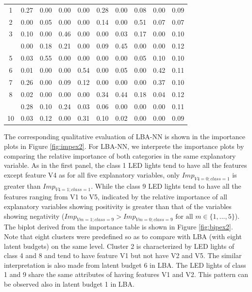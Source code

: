 \documentclass[]{interact}
\theoremstyle{plain}%
\theoremstyle{definition}
\theoremstyle{remark}
\begin{document}
\begin{table}[H]
{\begin{tabular}[t]{cccccccccc}
1 & 0.27 & 0.00 & 0.00 & 0.00 & 0.28 & 0.00 & 0.08 & 0.00 & 0.09\\
2 & 0.00 & 0.05 & 0.00 & 0.00 & 0.14 & 0.00 & 0.51 & 0.07 & 0.07\\
3 & 0.10 & 0.00 & 0.46 & 0.00 & 0.00 & 0.03 & 0.17 & 0.00 & 0.10\\
\addlinespace
4 & 0.00 & 0.18 & 0.21 & 0.00 & 0.09 & 0.45 & 0.00 & 0.00 & 0.12\\
5 & 0.03 & 0.55 & 0.00 & 0.00 & 0.00 & 0.00 & 0.05 & 0.10 & 0.10\\
6 & 0.01 & 0.00 & 0.00 & 0.54 & 0.00 & 0.05 & 0.00 & 0.42 & 0.11\\
7 & 0.26 & 0.00 & 0.09 & 0.12 & 0.00 & 0.00 & 0.00 & 0.37 & 0.10\\
8 & 0.02 & 0.00 & 0.00 & 0.00 & 0.34 & 0.44 & 0.18 & 0.04 & 0.12\\
\addlinespace
9 & 0.28 & 0.10 & 0.24 & 0.03 & 0.06 & 0.00 & 0.00 & 0.00 & 0.11\\
10 & 0.03 & 0.12 & 0.00 & 0.31 & 0.10 & 0.02 & 0.00 & 0.00 & 0.09\\
\bottomrule
\end{tabular}}
\end{table}

The corresponding qualitative evaluation of LBA-NN is shown in the
importance plots in Figure \ref{fig:impex2}. For LBA-NN, we interprete
the importance plots by comparing the relative importance of both
categories in the same explanatory variable. As in the first panel, the
class 1 LED lights tend to have all the features except feature V4 as
for all five explanatory variables, only \(Imp_{V4=0;class=1}\) is
greater than \(Imp_{V4=1;class=1}\). While the class 9 LED lights tend
to have all the features ranging from V1 to V5, indicated by the
relative importance of all explanatory variables showing positivity is
greater than that of the variables showing negativity
(\(Imp_{Vm=1;class=9} > Imp_{Vm=0;class=9} \text{ for all } m \in \{1, ...,5\}\)).
The biplot derived from the importance table is shown in Figure
\ref{fig:bipex2}. Note that eight clusters were predefined so as to
compare with LBA (with eight latent budgets) on the same level. Cluster
2 is characterized by LED lights of class 4 and 8 and tend to have
feature V1 but not have V2 and V5. The similar interpretation is also
made from latent budget 6 in LBA. The LED lights of class 1 and 9 share
the same attributes of having features V1 and V2. This pattern can be
observed also in latent budget 1 in LBA.
\end{document}
